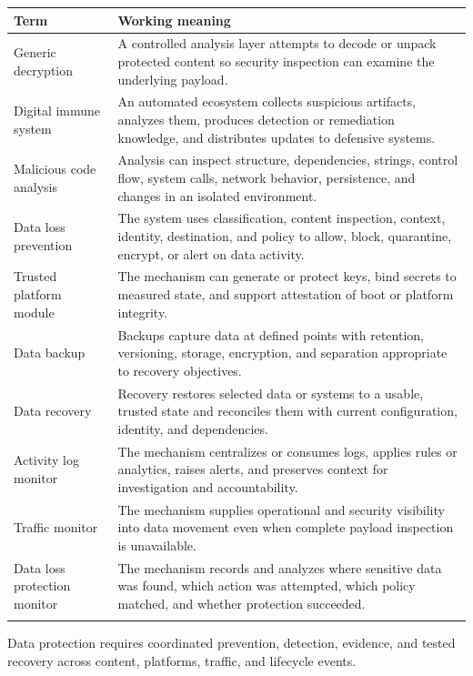 \documentclass[11pt]{article}
\begin{document}
\begin{longtable}{@{}>{\RaggedRight\arraybackslash}p{}>{\RaggedRight\arraybackslash}p{}@{}}
\toprule\rowcolor{Navy}\color{white}\textbf{Term} & \color{white}\textbf{Working meaning}\\\midrule\endhead
Generic decryption & A controlled analysis layer attempts to decode or unpack protected content so security inspection can examine the underlying payload. \\\addlinespace[2pt]
Digital immune system & An automated ecosystem collects suspicious artifacts, analyzes them, produces detection or remediation knowledge, and distributes updates to defensive systems. \\\addlinespace[2pt]
Malicious code analysis & Analysis can inspect structure, dependencies, strings, control flow, system calls, network behavior, persistence, and changes in an isolated environment. \\\addlinespace[2pt]
Data loss prevention & The system uses classification, content inspection, context, identity, destination, and policy to allow, block, quarantine, encrypt, or alert on data activity. \\\addlinespace[2pt]
Trusted platform module & The mechanism can generate or protect keys, bind secrets to measured state, and support attestation of boot or platform integrity. \\\addlinespace[2pt]
Data backup & Backups capture data at defined points with retention, versioning, storage, encryption, and separation appropriate to recovery objectives. \\\addlinespace[2pt]
Data recovery & Recovery restores selected data or systems to a usable, trusted state and reconciles them with current configuration, identity, and dependencies. \\\addlinespace[2pt]
Activity log monitor & The mechanism centralizes or consumes logs, applies rules or analytics, raises alerts, and preserves context for investigation and accountability. \\\addlinespace[2pt]
Traffic monitor & The mechanism supplies operational and security visibility into data movement even when complete payload inspection is unavailable. \\\addlinespace[2pt]
Data loss protection monitor & The mechanism records and analyzes where sensitive data was found, which action was attempted, which policy matched, and whether protection succeeded. \\\addlinespace[2pt]
\bottomrule
\end{longtable}
\begin{takeawaybox}
Data protection requires coordinated prevention, detection, evidence, and tested recovery across content, platforms, traffic, and lifecycle events.
\end{takeawaybox}
\end{document}

